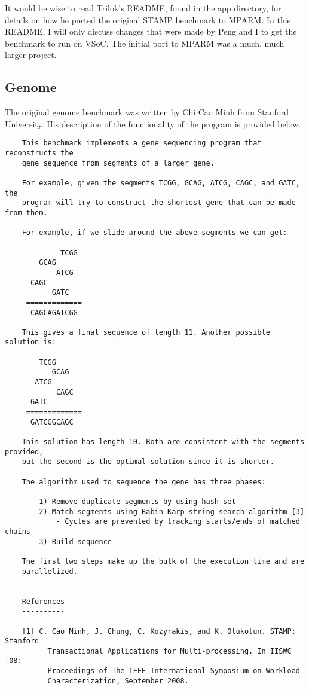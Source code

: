 \documentclass{article}
\begin{document}
It would be wise to read Trilok's README, found in the app directory, for 
details on how he ported the original STAMP benchmark to MPARM. In this README,
I will only discuss changes that were made by Peng and I to get the benchmark
to run on VSoC. The initial port to MPARM was a much, much larger project. 

\subsection{Genome}

The original genome benchmark was written by Chi Cao Minh from Stanford 
University. His description of the functionality of the program is provided 
below.

\begin{verbatim}
    This benchmark implements a gene sequencing program that reconstructs the 
    gene sequence from segments of a larger gene.

    For example, given the segments TCGG, GCAG, ATCG, CAGC, and GATC, the 
    program will try to construct the shortest gene that can be made from them.

    For example, if we slide around the above segments we can get:

             TCGG
        GCAG
            ATCG
      CAGC
           GATC
     =============
      CAGCAGATCGG

    This gives a final sequence of length 11. Another possible solution is:

        TCGG
           GCAG
       ATCG
            CAGC
      GATC
     =============
      GATCGGCAGC

    This solution has length 10. Both are consistent with the segments provided,
    but the second is the optimal solution since it is shorter.

    The algorithm used to sequence the gene has three phases:

        1) Remove duplicate segments by using hash-set
        2) Match segments using Rabin-Karp string search algorithm [3]
            - Cycles are prevented by tracking starts/ends of matched chains
        3) Build sequence

    The first two steps make up the bulk of the execution time and are 
    parallelized.


    References
    ----------

    [1] C. Cao Minh, J. Chung, C. Kozyrakis, and K. Olukotun. STAMP: Stanford 
          Transactional Applications for Multi-processing. In IISWC '08: 
          Proceedings of The IEEE International Symposium on Workload 
          Characterization, September 2008. 


\end{verbatim}
\end{document}
